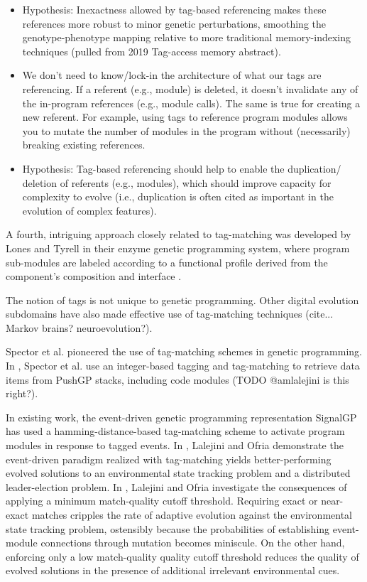 \begin{itemize}
  \item Hypothesis: Inexactness allowed by tag-based referencing makes these references
        more robust to minor genetic perturbations, smoothing the genotype-phenotype
        mapping relative to more traditional memory-indexing techniques (pulled from
        2019 Tag-access memory abstract).
  \item We don't need to know/lock-in the architecture of what our tags are referencing.
        If a referent (e.g., module) is deleted, it doesn't invalidate any of the
        in-program references (e.g., module calls). The same is true for creating
        a new referent. For example, using tags to reference program modules allows
        you to mutate the number of modules in the program without (necessarily)
        breaking existing references.
  \item Hypothesis: Tag-based referencing should help to enable the duplication/
        deletion of referents (e.g., modules), which should improve capacity for
        complexity to evolve (i.e., duplication is often cited as important in the
        evolution of complex features).
\end{itemize}

A fourth, intriguing approach closely related to tag-matching was developed by Lones and Tyrell in their enzyme genetic programming system, where program sub-modules are labeled according to a functional profile derived from the component's composition and interface \citep{lones2002biomimetic}.

The notion of tags is not unique to genetic programming.
Other digital evolution subdomains have also made effective use of tag-matching techniques (cite... Markov brains? neuroevolution?).

Spector et al. pioneered the use of tag-matching schemes in genetic programming.
In \citep{spector2011tag}, Spector et al. use an integer-based tagging and tag-matching to retrieve data items from PushGP stacks, including code modules (TODO @amlalejini is this right?).

In existing work, the event-driven genetic programming representation SignalGP has used a hamming-distance-based tag-matching scheme to activate program modules in response to tagged events.
In \citep{lalejini2018evolving}, Lalejini and Ofria demonstrate the event-driven paradigm realized with tag-matching yields better-performing evolved solutions to an environmental state tracking problem and a distributed leader-election problem.
In \citep{lalejini2019}, Lalejini and Ofria investigate the consequences of applying a minimum match-quality cutoff threshold.
Requiring exact or near-exact matches cripples the rate of adaptive evolution against the environmental state tracking problem, ostensibly because the probabilities of establishing event-module connections through mutation becomes miniscule.
On the other hand, enforcing only a low match-quality quality cutoff threshold reduces the quality of evolved solutions in the presence of additional irrelevant environmental cues.


